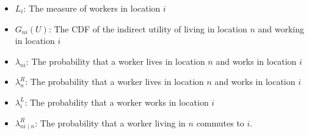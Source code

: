\begin{itemize}
    \item $L_i$: The measure of workers in location $i$
    \item $G_{ni}(U)$: The CDF of the indirect utility of living in location $n$ and working in location $i$
    \item $\lambda_{ni}$: The probability that a worker lives in location $n$ and works in location $i$
    \item $\lambda_n^R$: The probability that a worker lives in location $n$ and works in location $i$
    \item $\lambda_i^L$: The probability that a worker works in location $i$
    \item $\lambda_{ni\mid n}^R$: The probability that a worker living in $n$ commutes to $i$.
\end{itemize}
